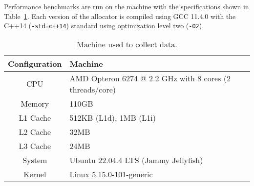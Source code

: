 Performance benchmarks are run on the machine with the specifications shown in Table~\ref{table:machines}. Each version of the allocator is compiled using GCC 11.4.0 with the C++14 (\texttt{-std=c++14}) standard using optimization level two (\texttt{-O2}).

\begin{table}[H]
    \centering
\begin{tabular}{cp{11.3cm}}
    \textbf{Configuration} & \textbf{Machine} \\ \hline
CPU           & AMD Opteron 6274 @ 2.2 GHz with 8 cores (2 threads/core)\\ \hline
Memory        & 110GB                                                   \\ \hline
L1 Cache      & 512KB (L1d), 1MB (L1i)                                  \\ \hline
L2 Cache      & 32MB                                                    \\ \hline
L3 Cache      & 24MB                                                    \\ \hline
System        & Ubuntu 22.04.4 LTS (Jammy Jellyfish)                    \\ \hline
Kernel        & Linux 5.15.0-101-generic
\end{tabular}
\caption{Machine used to collect data.}
\label{table:machines}
\end{table}
